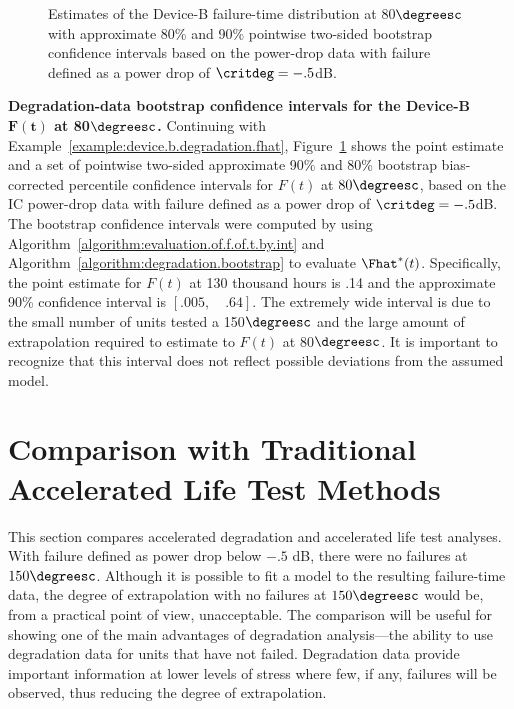 \begin{figure}
\caption{Estimates of the Device-B failure-time distribution at 80$\degreesc$
with approximate 80\% and 90\% pointwise two-sided bootstrap
confidence intervals based on the power-drop data with failure defined
as a power drop of $\critdeg = -.5$dB.}
\label{figure:device.b.80.ci.cdf.ps}
\end{figure}

\begin{example}{\bf Degradation-data bootstrap 
	confidence intervals for the Device-B $\boldsymbol{F(t)}$ at
80$\degreesc$.}
\label{example:device.b.degradation.ci}
Continuing with Example~\ref{example:device.b.degradation.fhat},
Figure~\ref{figure:device.b.80.ci.cdf.ps} shows the point estimate and
a set of pointwise two-sided approximate 90\% and 80\% bootstrap
bias-corrected percentile confidence intervals for $F(t)$ at
$80\degreesc$, based on the IC power-drop data with failure defined as
a power drop of $\critdeg = -.5$dB. The bootstrap confidence intervals
were computed by using
Algorithm~\ref{algorithm:evaluation.of.f.of.t.by.int} and
Algorithm~\ref{algorithm:degradation.bootstrap} to evaluate
$\Fhat^{*}(t)$. Specifically, the point estimate for $F(t)$ at 130
thousand hours is .14 and the approximate 90\% confidence interval is
$[.005,\quad .64]$. The extremely wide interval is due to the small
number of units tested a 150$\degreesc$ and the large amount of
extrapolation required to estimate to $F(t)$ at 80$\degreesc$.  It is
important to recognize that this interval does not reflect possible
deviations from the assumed model.
\end{example}

\section{Comparison with Traditional Accelerated Life Test Methods}
\label{section:adt.compare.alt}

This section compares accelerated degradation and accelerated life
test analyses.  With failure defined as power drop below $-.5$ dB,
there were no failures at $150\degreesc$.  Although it is possible to
fit a model to the resulting failure-time data, the degree of extrapolation
with no failures at $150\degreesc$ would be, from a practical point of
view, unacceptable. The comparison will be useful for showing
one of the main advantages of degradation analysis---the ability to
use degradation data for units that have not failed. Degradation data provide
important information at lower levels of stress where few, if any,
failures will be observed, thus reducing the degree of extrapolation.


